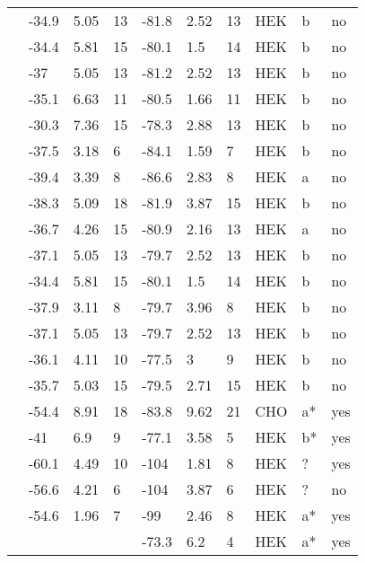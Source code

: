 \begin{footnotesize}
\begin{longtable}{p{5cm}|lll|lll|lll}
\citet{Kapplinger2015MutationDB} & -34.9 & 5.05 & 13 & -81.8 & 2.52 & 13 & HEK & b & no \\
\citet{Kapplinger2015MutationDB} & -34.4 & 5.81 & 15 & -80.1 & 1.5 & 14 & HEK & b & no \\
\citet{Kapplinger2015MutationDB} & -37 & 5.05 & 13 & -81.2 & 2.52 & 13 & HEK & b & no \\
\citet{Kapplinger2015MutationDB} & -35.1 & 6.63 & 11 & -80.5 & 1.66 & 11 & HEK & b & no \\
\citet{Kapplinger2015MutationDB} & -30.3 & 7.36 & 15 & -78.3 & 2.88 & 13 & HEK & b & no \\
\citet{Kapplinger2015MutationDB} & -37.5 & 3.18 & 6 & -84.1 & 1.59 & 7 & HEK & b & no \\
\citet{Kapplinger2015MutationDB} & -39.4 & 3.39 & 8 & -86.6 & 2.83 & 8 & HEK & a & no \\
\citet{Kapplinger2015MutationDB} & -38.3 & 5.09 & 18 & -81.9 & 3.87 & 15 & HEK & b & no \\
\citet{Kapplinger2015MutationDB} & -36.7 & 4.26 & 15 & -80.9 & 2.16 & 13 & HEK & a & no \\
\citet{Kapplinger2015MutationDB} & -37.1 & 5.05 & 13 & -79.7 & 2.52 & 13 & HEK & b & no \\
\citet{Kapplinger2015MutationDB} & -34.4 & 5.81 & 15 & -80.1 & 1.5 & 14 & HEK & b & no \\
\citet{Kapplinger2015MutationDB} & -37.9 & 3.11 & 8 & -79.7 & 3.96 & 8 & HEK & b & no \\
\citet{Kapplinger2015MutationDB} & -37.1 & 5.05 & 13 & -79.7 & 2.52 & 13 & HEK & b & no \\
\citet{Kapplinger2015MutationDB} & -36.1 & 4.11 & 10 & -77.5 & 3 & 9 & HEK & b & no \\
\citet{Kapplinger2015MutationDB} & -35.7 & 5.03 & 15 & -79.5 & 2.71 & 15 & HEK & b & no \\
\citet{Kato2014MutationDB} & -54.4 & 8.91 & 18 & -83.8 & 9.62 & 21 & CHO & a* & yes \\
\citet{Keller2005MutationDB} & -41 & 6.9 & 9 & -77.1 & 3.58 & 5 & HEK & b* & yes \\
\citet{Keller2006MutationDB} & -60.1 & 4.49 & 10 & -104 & 1.81 & 8 & HEK & ? & yes \\
\citet{Li2009MutationDB} & -56.6 & 4.21 & 6 & -104 & 3.87 & 6 & HEK & ? & no \\
\citet{Lin2008MutationDB} & -54.6 & 1.96 & 7 & -99 & 2.46 & 8 & HEK & a* & yes \\
\citet{Liu2002MutationDB} & && & -73.3 & 6.2 & 4 & HEK & a* & yes \\

\end{longtable}
\end{footnotesize}

